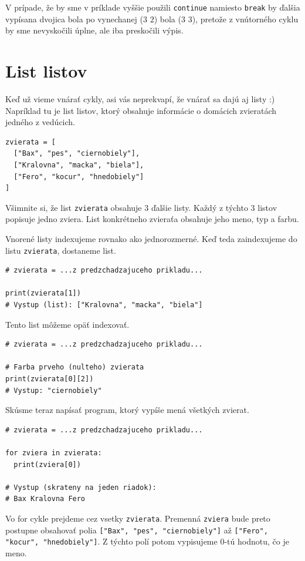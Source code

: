 V prípade, že by sme v príklade vyššie použili \texttt{continue} namiesto \texttt{break} by ďalšia vypísana dvojica bola po vynechanej ($3$ $2$) bola
($3$ $3$), pretože z vnútorného cyklu by sme nevyskočili úplne, ale iba preskočili výpis.

\section{List listov}
Keď už vieme vnárať cykly, asi vás neprekvapí, že vnárať sa dajú aj listy :)
Napríklad tu je list listov, ktorý obsahuje informácie o domácich zvieratách jedného z vedúcich.
\begin{lstlisting}
zvierata = [
  ["Bax", "pes", "ciernobiely"],
  ["Kralovna", "macka", "biela"],
  ["Fero", "kocur", "hnedobiely"]
]
\end{lstlisting}
Všimnite si, že list \texttt{zvierata} obsahuje $3$ ďalšie listy. Každý z týchto $3$ listov popisuje jedno zviera. List konkrétneho zvieraťa obsahuje jeho meno, typ a farbu.

Vnorené listy indexujeme rovnako ako jednorozmerné. Keď teda zaindexujeme do listu \texttt{zvierata}, dostaneme list.
\begin{lstlisting}
# zvierata = ...z predzchadzajuceho prikladu...

print(zvierata[1])
# Vystup (list): ["Kralovna", "macka", "biela"]
\end{lstlisting}
Tento list môžeme opäť indexovať.
\begin{lstlisting}
# zvierata = ...z predzchadzajuceho prikladu...

# Farba prveho (nulteho) zvierata
print(zvierata[0][2])
# Vystup: "ciernobiely"
\end{lstlisting}
Skúsme teraz napísať program, ktorý vypíše mená všetkých zvierat.
\begin{lstlisting}
# zvierata = ...z predzchadzajuceho prikladu...

for zviera in zvierata:
  print(zviera[0])

# Vystup (skrateny na jeden riadok):
# Bax Kralovna Fero
\end{lstlisting}
Vo for cykle prejdeme cez vsetky \texttt{zvierata}. Premenná \texttt{zviera} bude preto postupne obsahovať polia \texttt{["Bax", "pes", "ciernobiely"]} až
\texttt{["Fero", "kocur", "hnedobiely"]}. Z týchto polí potom vypisujeme $0$-tú hodnotu, čo je meno.

